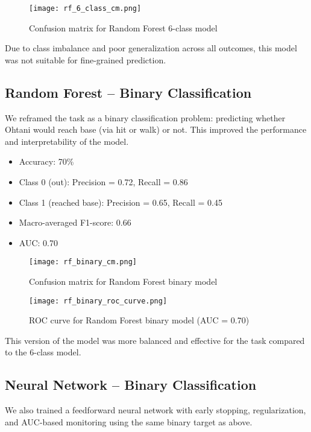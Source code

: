 \documentclass[conference]{IEEEtran}
\begin{document}
\begin{figure}[H]
    \centering
    \texttt{[image: rf\_6\_class\_cm.png]}
    \caption{Confusion matrix for Random Forest 6-class model}
    \label{fig:rf_6_class_cm}
\end{figure}

Due to class imbalance and poor generalization across all outcomes, this model was not suitable for fine-grained prediction.

\subsection{Random Forest – Binary Classification}

We reframed the task as a binary classification problem: predicting whether Ohtani would reach base (via hit or walk) or not. This improved the performance and interpretability of the model.

\begin{itemize}
    \item Accuracy: 70\%
    \item Class 0 (out): Precision = 0.72, Recall = 0.86
    \item Class 1 (reached base): Precision = 0.65, Recall = 0.45
    \item Macro-averaged F1-score: 0.66
    \item AUC: 0.70
\end{itemize}

\begin{figure}[H]
    \centering
    \texttt{[image: rf\_binary\_cm.png]}
    \caption{Confusion matrix for Random Forest binary model}
    \label{fig:rf_binary_cm}
\end{figure}

\begin{figure}[H]
    \centering
    \texttt{[image: rf\_binary\_roc\_curve.png]}
    \caption{ROC curve for Random Forest binary model (AUC = 0.70)}
    \label{fig:rf_binary_roc}
\end{figure}

This version of the model was more balanced and effective for the task compared to the 6-class model.

\subsection{Neural Network – Binary Classification}

We also trained a feedforward neural network with early stopping, regularization, and AUC-based monitoring using the same binary target as above.
\end{document}
